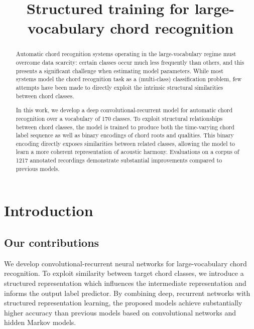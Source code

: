 \documentclass{article}
\title{Structured training for large-vocabulary chord recognition}
\begin{document}
%
\maketitle
%
\begin{abstract}
Automatic chord recognition systems operating in the large-vocabulary regime must overcome data scarcity: certain classes occur much less frequently than others, and this presents a significant challenge when estimating model parameters.
While most systems model the chord recognition task as a (multi-class) classification problem, few attempts have been made to directly exploit the intrinsic structural similarities between chord classes.

In this work, we develop a deep convolutional-recurrent model for automatic chord recognition over a vocabulary of 170 classes.
To exploit structural relationships between chord classes, the model is trained to produce both the time-varying chord label sequence as well as binary encodings of chord roots and qualities.
This binary encoding directly exposes similarities between related classes, allowing the model to learn a more coherent representation of acoustic harmony.
Evaluations on a corpus of 1217 annotated recordings demonstrate substantial improvements compared to previous models.
\end{abstract}
%
\section{Introduction}\label{sec:introduction}





\subsection{Our contributions}

We develop convolutional-recurrent neural networks for large-vocabulary chord recognition.
To exploit similarity between target chord classes, we introduce a structured representation which influences the intermediate representation and informs the output label predictor.
By combining deep, recurrent networks with structured representation learning, the proposed models achieve substantially higher accuracy than previous models based on convolutional networks and hidden Markov models.
\end{document}
